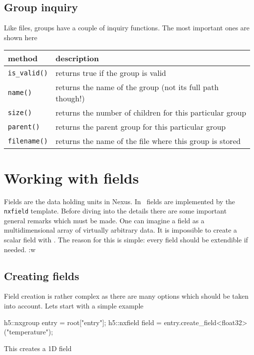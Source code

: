 \subsection{Group inquiry}

Like files, groups have a couple of inquiry functions. The most important ones
are shown here
\begin{center}
\begin{tabular}{l|l}
method & description \\
\hline\hline
{\tt is\_valid()} & returns true if the group is valid \\
\hline
{\tt name()} & returns the name of the group (not its full path though!) \\
\hline
{\tt size()} & returns the number of children for this particular group \\
\hline
{\tt parent()} & returns the parent group for this particular group \\
\hline
{\tt filename()} & returns the name of the file where this group is stored \\
\hline
\end{tabular}
\end{center}



\section{Working with fields}

Fields are the data holding units in Nexus.  In \libpniio\ fields are 
implemented by the {\tt nxfield} template. Before diving into the details there
are some important general remarks which must be made. One can imagine a field as a
multidimensional array of virtually arbitrary data. It is impossible to create 
a scalar field with \libpniio. The reason for this is simple: every field should
be extendible if needed. :w


\subsection{Creating fields}

Field creation is rather complex as there are many options which should be taken
into account. Lets start with a simple example
\begin{cppcode}
h5::nxgroup entry = root["entry"];
h5::nxfield field = entry.create_field<float32>("temperature");
\end{cppcode}
This creates a 1D field

